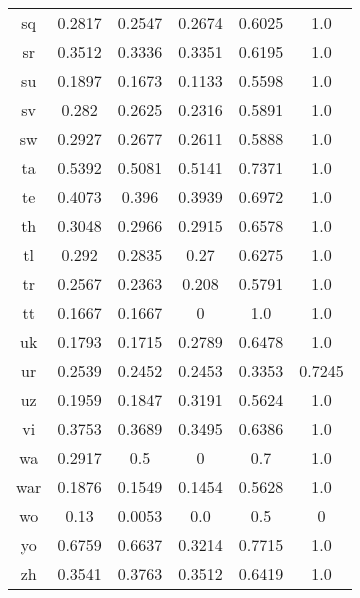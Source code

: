 \begin{figure}[h]
\begin{tabular}{cccccc}
sq&0.2817&0.2547&0.2674&0.6025&1.0\\
sr&0.3512&0.3336&0.3351&0.6195&1.0\\
su&0.1897&0.1673&0.1133&0.5598&1.0\\
sv&0.282&0.2625&0.2316&0.5891&1.0\\
sw&0.2927&0.2677&0.2611&0.5888&1.0\\
ta&0.5392&0.5081&0.5141&0.7371&1.0\\
te&0.4073&0.396&0.3939&0.6972&1.0\\
th&0.3048&0.2966&0.2915&0.6578&1.0\\
tl&0.292&0.2835&0.27&0.6275&1.0\\
tr&0.2567&0.2363&0.208&0.5791&1.0\\
tt&0.1667&0.1667&0&1.0&1.0\\
uk&0.1793&0.1715&0.2789&0.6478&1.0\\
ur&0.2539&0.2452&0.2453&0.3353&0.7245\\
uz&0.1959&0.1847&0.3191&0.5624&1.0\\
vi&0.3753&0.3689&0.3495&0.6386&1.0\\
wa&0.2917&0.5&0&0.7&1.0\\
war&0.1876&0.1549&0.1454&0.5628&1.0\\
wo&0.13&0.0053&0.0&0.5&0\\
yo&0.6759&0.6637&0.3214&0.7715&1.0\\
zh&0.3541&0.3763&0.3512&0.6419&1.0\\
\hline\hline
\end{tabular}
\end{figure}
